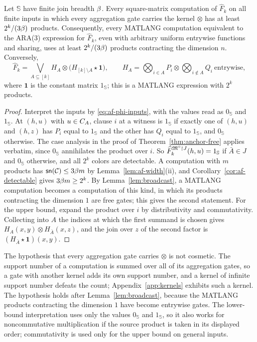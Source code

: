 \begin{theorem}\label{thm:af-weighted}
Let $\mathbb S$ have finite join breadth $\beta$. Every square-matrix
computation of $\widehat F_k$ on all finite inputs in which every
aggregation gate carries the kernel $\otimes$ has at least
$2^k/(3\beta)$ products. Consequently, every MATLANG computation
equivalent to the ARA(3) expression for $\widehat F_k$, even with
arbitrary uniform entrywise functions and sharing, uses at least
$2^k/(3\beta)$ products contracting the dimension $n$. Conversely,
\[
 \widehat F_k=\bigvee_{A\subseteq[k]}H_A\otimes
 \bigl(H_{[k]\setminus A}\star\mathbf 1\bigr),\qquad
 H_A=\bigotimes_{i\in A}P_i\otimes\bigotimes_{i\notin A}Q_i
 \ \text{entrywise},
\]
where $\mathbf 1$ is the constant matrix $1_{\mathbb S}$; this is a
MATLANG expression with $2^k$ products.
\end{theorem}
\begin{proof}
Interpret the inputs by \eqref{eq:af-phi-inputs}, with the values read as
$0_{\mathbb S}$ and $1_{\mathbb S}$. At $(h,u)$ with $u\in C_{A}$, clause
$i$ at a witness is $1_{\mathbb S}$ if exactly one of $(h,u)$ and $(h,z)$
has $P_i$ equal to $1_{\mathbb S}$ and the other has $Q_i$ equal to
$1_{\mathbb S}$, and $0_{\mathbb S}$ otherwise. The case analysis in the
proof of Theorem~\ref{thm:anchor-free} applies verbatim, since
$0_{\mathbb S}$ annihilates the product over $i$. So
$\widehat F_k^{\mathfrak M^\circ\mathord{\restriction} J}(h,u)=1_{\mathbb S}$ if $\bar A\in J$ and
$0_{\mathbb S}$ otherwise, and all $2^k$ colors are detectable. A
computation with $m$ products has $\mathsf{sn}(\mathcal C)\le3\beta m$ by
Lemma~\ref{lem:af-width}(ii), and Corollary~\ref{cor:af-detectable}
gives $3\beta m\ge2^k$. By Lemma~\ref{lem:broadcast}, a MATLANG
computation becomes a computation of this kind, in which its products
contracting the dimension $1$ are free gates; this gives the second
statement. For the upper bound, expand the product over $i$ by
distributivity and commutativity. Collecting into $A$ the indices at which
the first summand is chosen gives $H_A(x,y)\otimes H_{\bar A}(x,z)$, and
the join over $z$ of the second factor is
$(H_{\bar A}\star\mathbf 1)(x,y)$.
\end{proof}
The hypothesis that every aggregation gate carries $\otimes$ is not
cosmetic. The support number of a computation is summed over all of its
aggregation gates, so a gate with another kernel adds its own support
number, and a kernel of infinite support number defeats the count;
Appendix~\ref{app:kernels} exhibits such a kernel. The hypothesis holds
after Lemma~\ref{lem:broadcast}, because the MATLANG products contracting
the dimension $1$ have become entrywise gates. The lower-bound
interpretation uses only the values $0_{\mathbb S}$ and $1_{\mathbb S}$,
so it also works for noncommutative multiplication if the source product
is taken in its displayed order; commutativity is used only for the upper
bound on general inputs.

